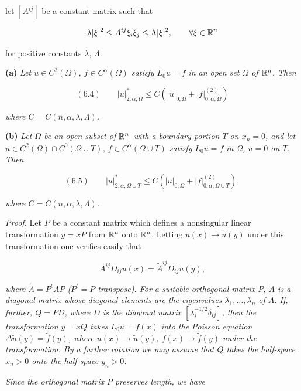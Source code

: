 



let $[A^{ij}]$ be a constant matrix such that

\[
\lambda |\xi|^2 \le A^{ij}\xi_i \xi_j \le \Lambda |\xi|^2, \qquad \forall \xi \in \mathbb{R}^n
\]

for positive constants $\lambda$, $\Lambda$.

\medskip

\noindent\textbf{(a)} \emph{Let $u \in C^2(\Omega)$, $f \in C^\alpha(\Omega)$ satisfy $L_0u=f$ in an open set $\Omega$ of $\mathbb{R}^n$. Then}

\[
(6.4)\qquad |u|_{2,\alpha;\Omega}^* \le C(|u|_{0;\Omega}+|f|_{0,\alpha;\Omega}^{(2)})
\]

\emph{where $C = C(n,\alpha,\lambda,\Lambda)$.}

\medskip

\noindent\textbf{(b)} \emph{Let $\Omega$ be an open subset of $\mathbb{R}^n_+$ with a boundary portion $T$ on $x_n=0$, and let $u \in C^2(\Omega)\cap C^0(\Omega \cup T)$, $f \in C^\alpha(\Omega \cup T)$ satisfy $L_0u=f$ in $\Omega$, $u=0$ on $T$. Then}

\[
(6.5)\qquad |u|_{2,\alpha;\Omega\cup T}^* \le C(|u|_{0;\Omega}+|f|_{0,\alpha;\Omega\cup T}^{(2)}),
\]

\emph{where $C = C(n,\alpha,\lambda,\Lambda)$.}

\medskip

\emph{Proof.} Let $P$ be a constant matrix which defines a nonsingular linear transformation $y=xP$ from $\mathbb{R}^n$ onto $\mathbb{R}^n$. Letting $u(x)\to \tilde u(y)$ under this transformation one verifies easily that

\[
A^{ij}D_{ij}u(x)=\tilde A^{ij}D_{ij}\tilde u(y),
\]

\emph{where $\tilde A = P^tAP$ ($P^t = P$ transpose). For a suitable orthogonal matrix $P$, $\tilde A$ is a diagonal matrix whose diagonal elements are the eigenvalues $\lambda_1,\ldots,\lambda_n$ of $A$. If, further, $Q=PD$, where $D$ is the diagonal matrix $[\lambda_i^{-1/2}\delta_{ij}]$, then the transformation $y=xQ$ takes $L_0u=f(x)$ into the Poisson equation $\Delta \tilde u(y)=\tilde f(y)$, where $u(x)\to \tilde u(y)$, $f(x)\to \tilde f(y)$ under the transformation. By a further rotation we may assume that $Q$ takes the half-space $x_n>0$ onto the half-space $y_n>0$.}

\medskip

\emph{Since the orthogonal matrix $P$ preserves length, we have}

